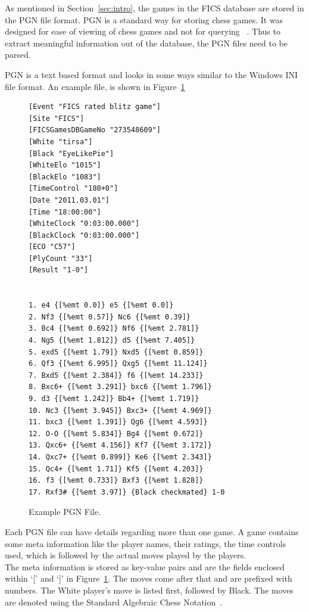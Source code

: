 \documentclass{article}
\begin{document}
As mentioned in Section~\ref{sec:intro}, the games in the FICS
database are stored in the PGN file format. PGN is a standard way for
storing chess games. It was designed for ease of viewing of chess
games and not for querying ~\cite{spec:pgn}. Thus to extract meaningful information out of the database, the PGN files need to be parsed.

PGN is a text based format and looks in some ways similar to the Windows INI file format. An example file, is shown in Figure~\ref{fig:pgn}

\begin{figure}[htp]
\begin{center}
\begin{verbatim}
[Event "FICS rated blitz game"]
[Site "FICS"]
[FICSGamesDBGameNo "273548609"]
[White "tirsa"]
[Black "EyeLikePie"]
[WhiteElo "1015"]
[BlackElo "1083"]
[TimeControl "180+0"]
[Date "2011.03.01"]
[Time "18:00:00"]
[WhiteClock "0:03:00.000"]
[BlackClock "0:03:00.000"]
[ECO "C57"]
[PlyCount "33"]
[Result "1-0"]


1. e4 {[%emt 0.0]} e5 {[%emt 0.0]} 
2. Nf3 {[%emt 0.57]} Nc6 {[%emt 0.39]} 
3. Bc4 {[%emt 0.692]} Nf6 {[%emt 2.781]} 
4. Ng5 {[%emt 1.812]} d5 {[%emt 7.405]} 
5. exd5 {[%emt 1.79]} Nxd5 {[%emt 0.859]} 
6. Qf3 {[%emt 6.995]} Qxg5 {[%emt 11.124]} 
7. Bxd5 {[%emt 2.384]} f6 {[%emt 14.233]} 
8. Bxc6+ {[%emt 3.291]} bxc6 {[%emt 1.796]} 
9. d3 {[%emt 1.242]} Bb4+ {[%emt 1.719]} 
10. Nc3 {[%emt 3.945]} Bxc3+ {[%emt 4.969]} 
11. bxc3 {[%emt 1.391]} Qg6 {[%emt 4.593]} 
12. O-O {[%emt 5.834]} Bg4 {[%emt 0.672]} 
13. Qxc6+ {[%emt 4.156]} Kf7 {[%emt 3.172]} 
14. Qxc7+ {[%emt 0.899]} Ke6 {[%emt 2.343]} 
15. Qc4+ {[%emt 1.71]} Kf5 {[%emt 4.203]} 
16. f3 {[%emt 0.733]} Bxf3 {[%emt 1.828]} 
17. Rxf3# {[%emt 3.97]} {Black checkmated} 1-0

\end{verbatim}
\end{center}

\caption{Example PGN File.}
\label{fig:pgn}
\end{figure}

Each PGN file can have details regarding more than one game. A game contains some meta information like the player names, their ratings, the time controls used, which is followed by the actual moves played by the players.\\

The meta information is stored as key-value pairs and are the fields enclosed within `[' and `]' in Figure~\ref{fig:pgn}. The moves come after that and are prefixed with numbers. The White player's move is listed first, followed by Black. The moves are denoted using the Standard Algebraic Chess Notation~\cite{wiki:san}. \\
\end{document}
